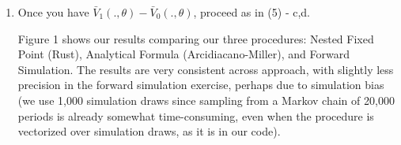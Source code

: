 \documentclass{article}
\begin{document}
\begin{enumerate}
\begin{enumerate}
\begin{enumerate}
\begin{answer}









\end{answer}

\end{enumerate}
\item Once you have $\bar{V}_1(., \theta) - \bar{V}_0(., \theta)$, proceed as in (5) - c,d. 

\begin{answer}

Figure 1 shows our results comparing our three procedures: Nested Fixed Point (Rust), Analytical Formula (Arcidiacano-Miller), and Forward Simulation. The results are very consistent across approach, with slightly less precision in the forward simulation exercise, perhaps due to simulation bias (we use 1,000 simulation draws since sampling from a Markov chain of 20,000 periods is already somewhat time-consuming, even when the procedure is vectorized over simulation draws, as it is in our code). 


\end{answer}
\end{enumerate}
\end{enumerate}
\end{document}
